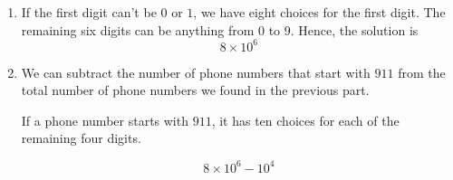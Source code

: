 \begin{enumerate}[label=(\alph*)]
\item If the first digit can't be $0$ or $1$, we have eight choices for the 
first digit. The remaining six digits can be anything from $0$ to $9$. Hence, 
the solution is
  $$ 8 \times 10^{6}$$

\item We can subtract the number of phone numbers that start with $911$ from 
the total number of phone numbers we found in the previous part. 

If a phone number starts with $911$, it has ten choices for each of the 
remaining four digits.

  $$ 8 \times 10^{6} - 10^{4} $$
\end{enumerate}